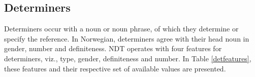 \documentclass[a4paper,12pt,english]{book}
\begin{document}

\subsection{Determiners}
Determiners occur with a noun or noun phrase, of which they determine or
specify the reference. In Norwegian, determiners agree with their head noun in
gender, number and definiteness. NDT operates with four features for
determiners, viz., type, gender, definiteness and number. In Table
\ref{detfeatures}, these features and their respective set of available values
are presented.
\end{document}
